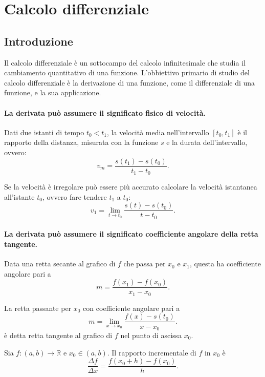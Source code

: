 \section{Calcolo differenziale}\label{sec:calc_diff}
\subsection{Introduzione}
Il calcolo differenziale è un sottocampo del calcolo infinitesimale che studia il cambiamento quantitativo di una funzione. L'obbiettivo primario di studio del calcolo differenziale è la derivazione di una funzione, come il \gls{differenziale} di una funzione, e la sua applicazione.

\paragraph{La derivata può assumere il significato fisico di velocità.} Dati due istanti di tempo $t_0<t_1$, la velocità media nell'intervallo $[t_0,t_1]$ è il rapporto della distanza, misurata con la funzione $s$ e la durata dell'intervallo, ovvero:
\begin{equation*}
    v_m=\frac{s(t_1)-s(t_0)}{t_1-t_0}.
\end{equation*}

Se la velocità è irregolare può essere più accurato calcolare la velocità istantanea all'istante $t_0$, ovvero fare tendere $t_1$ a $t_0$:
\begin{equation*}
    v_1=\lim_{t\rightarrow t_0}\frac{s(t)-s(t_0)}{t-t_0}.
\end{equation*}

\paragraph{La derivata può assumere il significato coefficiente angolare della retta tangente.} Data una retta secante al grafico di $f$ che passa per $x_0$ e $x_1$, questa ha coefficiente angolare pari a
\begin{equation*}
    m=\frac{f(x_1)-f(x_0)}{x_1-x_0}.
\end{equation*}

La retta passante per $x_0$ con coefficiente angolare pari a
\begin{equation*}
    m=\lim_{x\rightarrow x_0}\frac{f(x)-s(t_0)}{x-x_0}.
\end{equation*}
è detta retta tangente al grafico di $f$ nel punto di ascissa $x_0$.

\begin{definition}
    Sia $f\colon (a,b)\rightarrow\mathbb R$ e $x_0\in(a,b)$. Il rapporto incrementale di $f$ in $x_0$ è 
    \begin{equation}\label{eq:rapporto_incrementale}
    \frac{\Delta f}{\Delta x}=\frac{f(x_0+h)-f(x_0)}{h}.
    \end{equation}
\end{definition}

